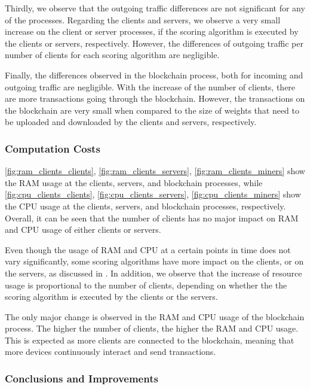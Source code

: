 Thirdly, we observe that the outgoing traffic differences are not significant for any of the processes. Regarding the clients and servers, we observe a very small increase on the client or server processes, if the scoring algorithm is executed by the clients or servers, respectively. However, the differences of outgoing traffic per number of clients for each scoring algorithm are negligible.

Finally, the differences observed in the blockchain process, both for incoming and outgoing traffic are negligible. With the increase of the number of clients, there are more transactions going through the blockchain. However, the transactions on the blockchain are very small when compared to the size of weights that need to be uploaded and downloaded by the clients and servers, respectively.

\subsubsection{Computation Costs}

\autoref{fig:ram_clients_clients}, \autoref{fig:ram_clients_servers}, \autoref{fig:ram_clients_miners} show the RAM usage at the clients, servers, and blockchain processes, while  \autoref{fig:cpu_clients_clients}, \autoref{fig:cpu_clients_servers}, \autoref{fig:cpu_clients_miners} show the CPU usage at the clients, servers, and blockchain processes, respectively. Overall, it can be seen that the number of clients has no major impact on RAM and CPU usage of either clients or servers.

Even though the usage of RAM and CPU at a certain points in time does not vary significantly, some scoring algorithms have more impact on the clients, or on the servers, as discussed in . In addition, we observe that the increase of resource usage is proportional to the number of clients, depending on whether the the scoring algorithm is executed by the clients or the servers.

The only major change is observed in the RAM and CPU usage of the blockchain process. The higher the number of clients, the higher the RAM and CPU usage. This is expected as more clients are connected to the blockchain, meaning that more devices continuously interact and send transactions.

\subsubsection{Conclusions and Improvements}

